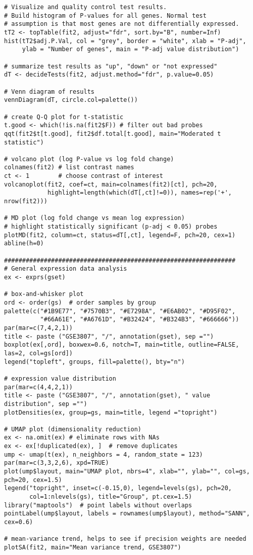 \begin{lstlisting}
# Visualize and quality control test results.
# Build histogram of P-values for all genes. Normal test
# assumption is that most genes are not differentially expressed.
tT2 <- topTable(fit2, adjust="fdr", sort.by="B", number=Inf)
hist(tT2$adj.P.Val, col = "grey", border = "white", xlab = "P-adj",
     ylab = "Number of genes", main = "P-adj value distribution")

# summarize test results as "up", "down" or "not expressed"
dT <- decideTests(fit2, adjust.method="fdr", p.value=0.05)

# Venn diagram of results
vennDiagram(dT, circle.col=palette())

# create Q-Q plot for t-statistic
t.good <- which(!is.na(fit2$F)) # filter out bad probes
qqt(fit2$t[t.good], fit2$df.total[t.good], main="Moderated t statistic")

# volcano plot (log P-value vs log fold change)
colnames(fit2) # list contrast names
ct <- 1        # choose contrast of interest
volcanoplot(fit2, coef=ct, main=colnames(fit2)[ct], pch=20,
            highlight=length(which(dT[,ct]!=0)), names=rep('+', nrow(fit2)))

# MD plot (log fold change vs mean log expression)
# highlight statistically significant (p-adj < 0.05) probes
plotMD(fit2, column=ct, status=dT[,ct], legend=F, pch=20, cex=1)
abline(h=0)

################################################################
# General expression data analysis
ex <- exprs(gset)

# box-and-whisker plot
ord <- order(gs)  # order samples by group
palette(c("#1B9E77", "#7570B3", "#E7298A", "#E6AB02", "#D95F02",
          "#66A61E", "#A6761D", "#B32424", "#B324B3", "#666666"))
par(mar=c(7,4,2,1))
title <- paste ("GSE3807", "/", annotation(gset), sep ="")
boxplot(ex[,ord], boxwex=0.6, notch=T, main=title, outline=FALSE, las=2, col=gs[ord])
legend("topleft", groups, fill=palette(), bty="n")

# expression value distribution
par(mar=c(4,4,2,1))
title <- paste ("GSE3807", "/", annotation(gset), " value distribution", sep ="")
plotDensities(ex, group=gs, main=title, legend ="topright")

# UMAP plot (dimensionality reduction)
ex <- na.omit(ex) # eliminate rows with NAs
ex <- ex[!duplicated(ex), ]  # remove duplicates
ump <- umap(t(ex), n_neighbors = 4, random_state = 123)
par(mar=c(3,3,2,6), xpd=TRUE)
plot(ump$layout, main="UMAP plot, nbrs=4", xlab="", ylab="", col=gs, pch=20, cex=1.5)
legend("topright", inset=c(-0.15,0), legend=levels(gs), pch=20,
       col=1:nlevels(gs), title="Group", pt.cex=1.5)
library("maptools")  # point labels without overlaps
pointLabel(ump$layout, labels = rownames(ump$layout), method="SANN", cex=0.6)

# mean-variance trend, helps to see if precision weights are needed
plotSA(fit2, main="Mean variance trend, GSE3807")
\end{lstlisting}

